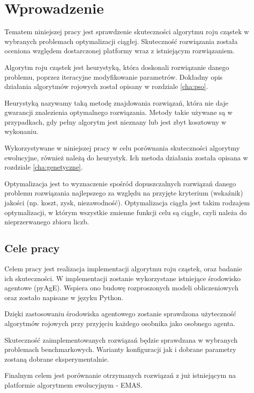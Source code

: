 \chapter{Wprowadzenie}
\label{cha:wstep}


Tematem niniejszej pracy jest sprawdzenie skuteczności algorytmu roju cząstek w wybranych problemach optymalizacji ciągłej. Skuteczność rozwiązania została oceniona względem dostarczonej platformy wraz z istniejącym rozwiązaniem.

Algorytm roju cząstek jest heurystyką, która doskonali rozwiązanie danego problemu, poprzez iteracyjne modyfikowanie parametrów. Dokładny opis działania algorytmów rojowych został opisany w rozdziale \ref{cha:pso}.

Heurystyką nazywamy taką metodę znajdowania rozwiązań, która nie daje gwarancji znalezienia optymalnego rozwiązania. Metody takie używane są w przypadkach, gdy pełny algorytm jest nieznany lub jest zbyt kosztowny w wykonaniu.

Wykorzystywane w niniejszej pracy w celu porównania skuteczności algorytmy ewolucyjne, również należą do heurystyk. Ich metoda działania została opisana w rozdziale \ref{cha:genetyczne}.

Optymalizacja jest to wyznaczenie spośród dopuszczalnych rozwiązań danego problemu rozwiązania najlepszego za względu na przyjęte kryterium (wskaźnik) jakości (np. koszt, zysk, niezawodność). Optymalizacja ciągła jest takim rodzajem optymalizacji, w którym wszystkie zmienne funkcji celu są ciągłe, czyli należa do nieprzerwanego zbioru liczb.


\section{Cele pracy}
\label{sec:celePracy}
Celem pracy jest realizacja implementacji algorytmu roju cząstek, oraz badanie ich skuteczności. W implementacji zostanie wykorzystane istniejące środowisko agentowe (pyAgE). Wspiera ono budowę rozproszonych modeli obliczeniowych oraz zostało napisane w języku Python.

Dzięki zastosowaniu środowiska agentowego zostanie sprawdzona użyteczność algorytmów rojowych przy przyjęciu każdego osobnika jako osobnego agenta.

Skuteczność zaimplementowanych rozwiązań będzie sprawdzana w wybranych problemach benchmarkowych. Warianty konfiguracji jak i dobrane parametry zostaną dobrane eksperymentalnie. 

Finalnym celem jest porównanie otrzymanych rozwiązań z już istniejącym na platformie algorytmem ewolucyjnym - EMAS.


